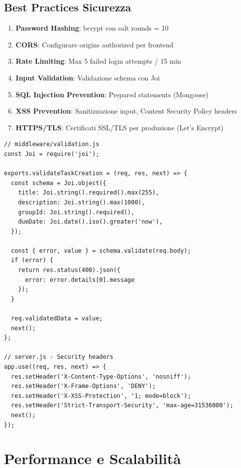 \documentclass[12pt,a4paper]{report}
\begin{document}
\section{Best Practices Sicurezza}

\begin{enumerate}
    \item \textbf{Password Hashing}: bcrypt con salt rounds = 10
    \item \textbf{CORS}: Configurare origins authorized per frontend
    \item \textbf{Rate Limiting}: Max 5 failed login attempts / 15 min
    \item \textbf{Input Validation}: Validazione schema con Joi
    \item \textbf{SQL Injection Prevention}: Prepared statements (Mongoose)
    \item \textbf{XSS Prevention}: Sanitizzazione input, Content Security Policy headers
    \item \textbf{HTTPS/TLS}: Certificati SSL/TLS per produzione (Let's Encrypt)
\end{enumerate}

\begin{lstlisting}
// middleware/validation.js
const Joi = require('joi');

exports.validateTaskCreation = (req, res, next) => {
  const schema = Joi.object({
    title: Joi.string().required().max(255),
    description: Joi.string().max(1000),
    groupId: Joi.string().required(),
    dueDate: Joi.date().iso().greater('now'),
  });
  
  const { error, value } = schema.validate(req.body);
  if (error) {
    return res.status(400).json({ 
      error: error.details[0].message 
    });
  }
  
  req.validatedData = value;
  next();
};

// server.js - Security headers
app.use((req, res, next) => {
  res.setHeader('X-Content-Type-Options', 'nosniff');
  res.setHeader('X-Frame-Options', 'DENY');
  res.setHeader('X-XSS-Protection', '1; mode=block');
  res.setHeader('Strict-Transport-Security', 'max-age=31536000');
  next();
});
\end{lstlisting}

\newpage

\chapter{Performance e Scalabilità}
\end{document}
